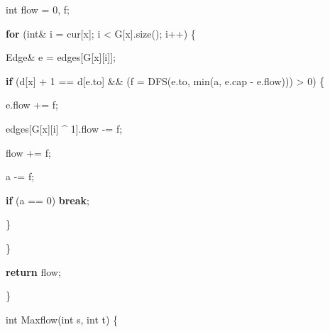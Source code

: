 \documentclass[
]{article}
\newenvironment{Shaded}{}{}
\newcommand{\ControlFlowTok}[1]{\textcolor[rgb]{0.00,0.44,0.13}{\textbf{#1}}}
\newcommand{\DataTypeTok}[1]{\textcolor[rgb]{0.56,0.13,0.00}{#1}}
\newcommand{\DecValTok}[1]{\textcolor[rgb]{0.25,0.63,0.44}{#1}}
\newcommand{\NormalTok}[1]{#1}
\newcommand{\OperatorTok}[1]{\textcolor[rgb]{0.40,0.40,0.40}{#1}}
\begin{document}
\begin{Shaded}
\begin{Highlighting}[]
    \DataTypeTok{int}\NormalTok{ flow }\OperatorTok{=} \DecValTok{0}\OperatorTok{,}\NormalTok{ f}\OperatorTok{;}

    \ControlFlowTok{for} \OperatorTok{(}\DataTypeTok{int}\OperatorTok{\&}\NormalTok{ i }\OperatorTok{=}\NormalTok{ cur}\OperatorTok{[}\NormalTok{x}\OperatorTok{];}\NormalTok{ i }\OperatorTok{\textless{}}\NormalTok{ G}\OperatorTok{[}\NormalTok{x}\OperatorTok{].}\NormalTok{size}\OperatorTok{();}\NormalTok{ i}\OperatorTok{++)} \OperatorTok{\{}

\NormalTok{      Edge}\OperatorTok{\&}\NormalTok{ e }\OperatorTok{=}\NormalTok{ edges}\OperatorTok{[}\NormalTok{G}\OperatorTok{[}\NormalTok{x}\OperatorTok{][}\NormalTok{i}\OperatorTok{]];}

      \ControlFlowTok{if} \OperatorTok{(}\NormalTok{d}\OperatorTok{[}\NormalTok{x}\OperatorTok{]} \OperatorTok{+} \DecValTok{1} \OperatorTok{==}\NormalTok{ d}\OperatorTok{[}\NormalTok{e}\OperatorTok{.}\NormalTok{to}\OperatorTok{]} \OperatorTok{\&\&} \OperatorTok{(}\NormalTok{f }\OperatorTok{=}\NormalTok{ DFS}\OperatorTok{(}\NormalTok{e}\OperatorTok{.}\NormalTok{to}\OperatorTok{,}\NormalTok{ min}\OperatorTok{(}\NormalTok{a}\OperatorTok{,}\NormalTok{ e}\OperatorTok{.}\NormalTok{cap }\OperatorTok{{-}}\NormalTok{ e}\OperatorTok{.}\NormalTok{flow}\OperatorTok{)))} \OperatorTok{\textgreater{}} \DecValTok{0}\OperatorTok{)} \OperatorTok{\{}

\NormalTok{        e}\OperatorTok{.}\NormalTok{flow }\OperatorTok{+=}\NormalTok{ f}\OperatorTok{;}

\NormalTok{        edges}\OperatorTok{[}\NormalTok{G}\OperatorTok{[}\NormalTok{x}\OperatorTok{][}\NormalTok{i}\OperatorTok{]} \OperatorTok{\^{}} \DecValTok{1}\OperatorTok{].}\NormalTok{flow }\OperatorTok{{-}=}\NormalTok{ f}\OperatorTok{;}

\NormalTok{        flow }\OperatorTok{+=}\NormalTok{ f}\OperatorTok{;}

\NormalTok{        a }\OperatorTok{{-}=}\NormalTok{ f}\OperatorTok{;}

        \ControlFlowTok{if} \OperatorTok{(}\NormalTok{a }\OperatorTok{==} \DecValTok{0}\OperatorTok{)} \ControlFlowTok{break}\OperatorTok{;}

      \OperatorTok{\}}

    \OperatorTok{\}}

    \ControlFlowTok{return}\NormalTok{ flow}\OperatorTok{;}

  \OperatorTok{\}}

  \DataTypeTok{int}\NormalTok{ Maxflow}\OperatorTok{(}\DataTypeTok{int}\NormalTok{ s}\OperatorTok{,} \DataTypeTok{int}\NormalTok{ t}\OperatorTok{)} \OperatorTok{\{}


\end{Highlighting}
\end{Shaded}
\end{document}
